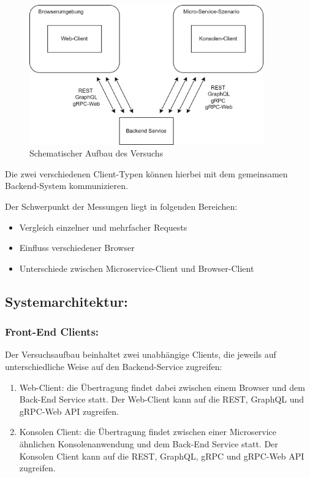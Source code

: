 \begin{figure}[htbp]
	\centering
	\includegraphics[width=0.9\textwidth]{images/Prototypschema.png}
	\caption{Schematischer Aufbau des Versuchs}
	\label{fig:backendservice}
\end{figure}

Die zwei verschiedenen Client-Typen können hierbei mit dem gemeinsamen Backend-System kommunizieren.

Der Schwerpunkt der Messungen liegt in folgenden Bereichen:

\begin{itemize}
	\item Vergleich einzelner und mehrfacher Requests
	\item Einfluss verschiedener Browser
	\item Unterschiede zwischen Microservice-Client und Browser-Client
\end{itemize}

\subsection*{Systemarchitektur:}

\subsubsection*{Front-End Clients:}
Der Versuchsaufbau beinhaltet zwei unabhängige Clients, die jeweils auf unterschiedliche Weise auf den Backend-Service zugreifen:
\begin{enumerate}
	\item Web-Client: die Übertragung findet dabei zwischen einem Browser und dem Back-End Service statt. Der Web-Client kann auf die REST, GraphQL und gRPC-Web API zugreifen.
	\item Konsolen Client: die Übertragung findet zwischen einer Microservice ähnlichen Konsolenanwendung und dem Back-End Service statt. Der Konsolen Client kann auf die REST, GraphQL, gRPC und gRPC-Web API zugreifen.
	
\end{enumerate}

